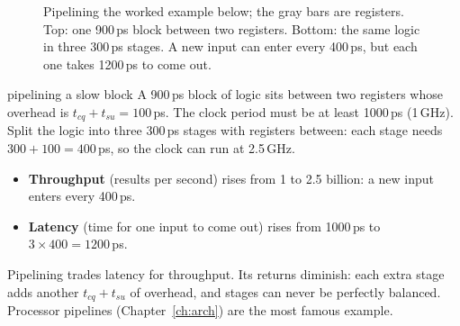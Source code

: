 \begin{figure}[h]
\centering
{}
\caption{Pipelining the worked example below; the gray bars are registers. Top: one 900\,ps block between two registers. Bottom: the same logic in three 300\,ps stages. A new input can enter every 400\,ps, but each one takes 1200\,ps to come out.}
\label{fig:pipeline}
\end{figure}

\begin{worked}{pipelining a slow block}
A 900\,ps block of logic sits between two registers whose overhead is $t_{cq} + t_{su} = 100$\,ps. The clock period must be at least 1000\,ps (1\,GHz). Split the logic into three 300\,ps stages with registers between: each stage needs $300 + 100 = 400$\,ps, so the clock can run at 2.5\,GHz.
\begin{itemize}
  \item \textbf{Throughput} (results per second) rises from 1 to 2.5 billion: a new input enters every 400\,ps.
  \item \textbf{Latency} (time for one input to come out) rises from 1000\,ps to $3 \times 400 = 1200$\,ps.
\end{itemize}
\end{worked}

Pipelining trades latency for throughput. Its returns diminish: each extra stage adds another $t_{cq} + t_{su}$ of overhead, and stages can never be perfectly balanced. Processor pipelines (Chapter~\ref{ch:arch}) are the most famous example.

